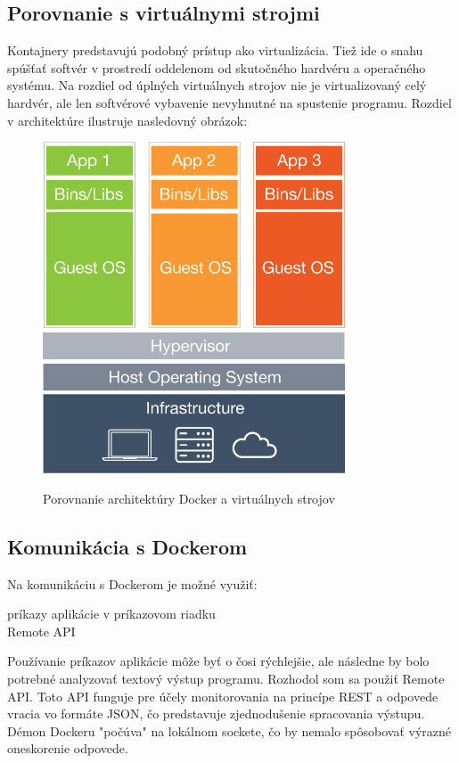 \documentclass[11pt,final,oneside]{fithesis}
\begin{document}
\subsection{Porovnanie s virtuálnymi strojmi}
Kontajnery predstavujú podobný prístup ako virtualizácia. Tiež ide o snahu spúšťať softvér v prostredí oddelenom od skutočného hardvéru a operačného systému. Na rozdiel od úplných virtuálnych strojov 
nie je virtualizovaný celý hardvér, ale len softvérové vybavenie nevyhnutné na spustenie programu. Rozdiel v architektúre ilustruje nasledovný obrázok: 
\begin{figure}[h]
\begin{center}
       \includegraphics[width=0.8\textwidth]{images/docker.png}
       \caption{Porovnanie architektúry Docker a virtuálnych strojov}\cite{docker}
\end{center}
\end{figure}

\subsection{Komunikácia s Dockerom}
Na komunikáciu s Dockerom je možné využiť:
\begin{description}
\item[príkazy aplikácie v príkazovom riadku]
\item[Remote API]
\end{description}

Používanie príkazov aplikácie môže byť o čosi rýchlejšie, ale následne by bolo potrebné analyzovať textový výstup programu.
Rozhodol som sa použiť Remote API. Toto API funguje pre účely monitorovania na princípe REST a odpovede vracia vo formáte JSON, čo predstavuje zjednodušenie spracovania výstupu. Démon Dockeru "počúva" na 
lokálnom sockete, čo by nemalo spôsobovať výrazné oneskorenie odpovede.
\end{document}
